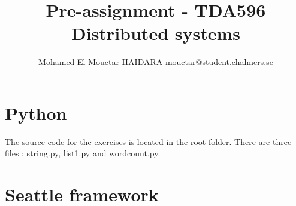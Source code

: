 \documentclass[12pt]{article}
\begin{document}
\title{Pre-assignment - TDA596 Distributed systems}
\author{Mohamed El Mouctar HAIDARA \href{mailto:mouctar@student.chalmers.se}{mouctar@student.chalmers.se}}

\maketitle

\section{Python}
The source code for the exercises is located in the root folder. There are three files : string.py, list1.py and wordcount.py.

\section{Seattle framework}
\end{document}

